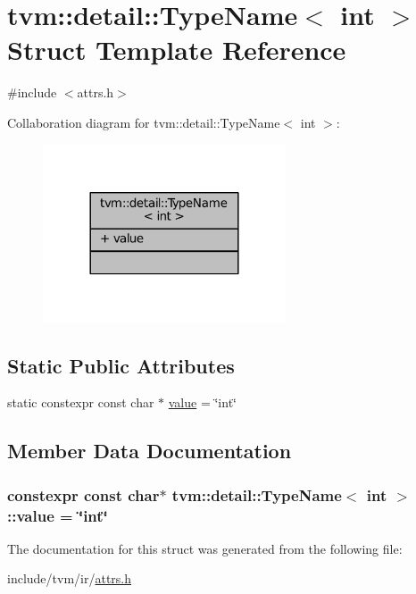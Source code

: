 \hypertarget{structtvm_1_1detail_1_1TypeName_3_01int_01_4}{}\section{tvm\+:\+:detail\+:\+:Type\+Name$<$ int $>$ Struct Template Reference}
\label{structtvm_1_1detail_1_1TypeName_3_01int_01_4}


{\ttfamily \#include $<$attrs.\+h$>$}



Collaboration diagram for tvm\+:\+:detail\+:\+:Type\+Name$<$ int $>$\+:
\nopagebreak
\begin{figure}[H]
\begin{center}
\leavevmode
\includegraphics[width=204pt]{structtvm_1_1detail_1_1TypeName_3_01int_01_4__coll__graph}
\end{center}
\end{figure}
\subsection*{Static Public Attributes}
\begin{DoxyCompactItemize}
\item 
static constexpr const char $\ast$ \hyperlink{structtvm_1_1detail_1_1TypeName_3_01int_01_4_a3d260766bba29599abdef176ac44a9aa}{value} = \char`\"{}int\char`\"{}
\end{DoxyCompactItemize}


\subsection{Member Data Documentation}
\subsubsection[{\texorpdfstring{value}{value}}]{\setlength{\rightskip}{0pt plus 5cm}constexpr const char$\ast$ {\bf tvm\+::detail\+::\+Type\+Name}$<$ int $>$\+::value = \char`\"{}int\char`\"{}\hspace{0.3cm}{\ttfamily [static]}}\hypertarget{structtvm_1_1detail_1_1TypeName_3_01int_01_4_a3d260766bba29599abdef176ac44a9aa}{}\label{structtvm_1_1detail_1_1TypeName_3_01int_01_4_a3d260766bba29599abdef176ac44a9aa}


The documentation for this struct was generated from the following file\+:\begin{DoxyCompactItemize}
\item 
include/tvm/ir/\hyperlink{ir_2attrs_8h}{attrs.\+h}\end{DoxyCompactItemize}

